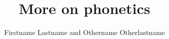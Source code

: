 \title{More on phonetics}
\subtitle{}
\author{Firstname Lastname and Othername Otherlastname}
\renewcommand{\lsSeries}{}
\newcommand{\lsSeriesTitle}{}
\newcommand{\lsSeriesColor}{gray}
\renewcommand{\lsSeriesNumber}{}
